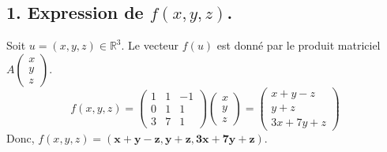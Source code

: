 \documentclass[french]{yLectureNote}
\begin{document}
\subsection*{1. Expression de $f(x,y,z)$.}
Soit $u = (x,y,z) \in \mathbb{R}^3$. Le vecteur $f(u)$ est donné par le produit matriciel $A \begin{pmatrix} x \\ y \\ z \end{pmatrix}$.
$$f(x,y,z) = \begin{pmatrix} 1 & 1 & -1 \\ 0 & 1 & 1 \\ 3 & 7 & 1 \end{pmatrix} \begin{pmatrix} x \\ y \\ z \end{pmatrix} = \begin{pmatrix} x+y-z \\ y+z \\ 3x+7y+z \end{pmatrix}$$
Donc, $f(x,y,z) = \mathbf{(x+y-z, y+z, 3x+7y+z)}$.
\end{document}

